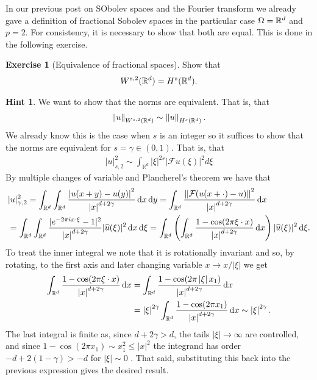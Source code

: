 \documentclass[12pt]{article}
\theoremstyle{definition}
\newtheorem{exercise}{Exercise}
\newtheorem*{hint}{Hint}
\renewcommand{\norm}[1]{\left\lVert #1 \right\rVert}\renewcommand{\abs}[1]{\left| #1 \right|}
\renewcommand{\d}{\,\mathrm{d}}
\begin{document}
In our previous post on SObolev spaces and the Fourier transform we already gave a definition of fractional Sobolev spaces in the particular case $\Omega =\mathbb{R}^d$ and $p=2$. For consistency, it is necessary to show that both are equal. This is done in the following exercise.
\begin{exercise}[Equivalence of fractional spaces]\label{equivalence fractional spaces}
  Show that
  \begin{align*}
    W^{s,2}(\mathbb{R}^d)= H^s(\mathbb{R}^d).
  \end{align*}
\end{exercise}
\begin{hint}
  We want to show that the norms are equivalent. That is, that
  \begin{align*}
    \norm{u}_{W^{s,2}(\R^d)}\sim \norm{u}_{H^s(\R^d)}.
  \end{align*}
  We already know this is the case when $s$ is an integer so it suffices to show that the norms are equivalent for $s= \gamma  \in (0,1)$. That is, that
  \begin{align*}
    |u|_{s,2}^2\sim \int_{\mathbb{R}^d}|\xi|^{2 s}|\mathcal{F} u(\xi)|^2 d \xi
  \end{align*}
  By multiple changes of variable and Plancherel's theorem we have that
  \begin{align*}
     & |u|_{\gamma ,2}^2  =\int_{\R^d}\int_{\R^d}\frac{\abs{u(x+y)-u(y)}^2}{\abs{x}^{d+2\gamma	}}\d x \d y                                                                                                       = \int_{\R^d}\frac{\norm{\Ff (u(x+\cdot )-u)}^2}{\abs{x}^{d+2\gamma	}}\d x \\
     & =\int_{\R^d}\int_{\R^d}  \frac{|e^{-2 \pi i x \cdot \xi}-1|^2}{\abs{x}^{d+2\gamma	}}|\wh{u}(\xi)|^2\d x\d\xi =\int_{\R^d}\left(\int_{\R^d}  \frac{1-\cos(2\pi \xi\cdot x)}{\abs{x}^{d+2\gamma	}}\d x\right)|\wh{u}(\xi)|^2\d\xi.
  \end{align*}
  To treat the inner integral we note that it is rotationally invariant and so, by rotating, to the first axis and later changing variable $x \to x / \abs{\xi}$ we get
  \begin{align*}
    \int_{\R^d}  \frac{1-\cos(2\pi \xi\cdot x)}{\abs{x}^{d+2\gamma	}}\d x & =\int_{\R^d}  \frac{1-\cos(2\pi \abs{\xi}x_1 )}{\abs{x}^{d+2\gamma	}}\d x                                          \\
                                                                          & =\abs{\xi}^{2 \gamma } \int_{\R^d}  \frac{1-\cos(2\pi  x_1) }{\abs{x}^{d+2\gamma	}}\d x\sim \abs{\xi}^{2 \gamma }.
  \end{align*}
  The last integral is finite as, since $d+2\gamma >d$, the tails $\abs{\xi}\to\infty$ are controlled, and since $1-\cos(2\pi x_1)\sim x_1^2\leq \abs{x}^2$ the integrand has order $-d+2(1-\gamma)>-d$ for $\abs{\xi}\sim 0$ . That said, substituting this back into the previous expression gives the desired result.
\end{hint}
\end{document}
